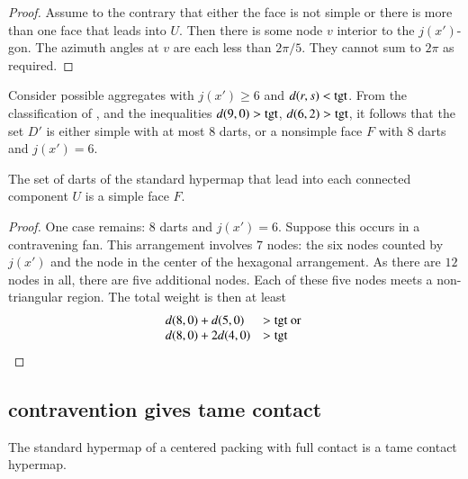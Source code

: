 \begin{proof} Assume to the contrary that either the face is not simple or there is more than one face that leads into $U$.  Then there is some node $v$ interior to the $j(x')$-gon.  The azimuth angles at $v$ are each less than $2\pi/5$. They cannot sum to $2\pi$ as required.
\end{proof}

Consider possible aggregates with $j(x')\ge 6$ and $d(r,s)<{\operatorname{tgt}}$.
From the classification of \cite[p.~126,~Fig.~12.1]{Hales:2006:DCG}, and the inequalities $d(9,0) > {\operatorname{tgt}}$, $d(6,2) > {\operatorname{tgt}}$, it follows that the set $D'$
is either simple with at most $8$ darts, or a nonsimple face $F$ with $8$ darts and $j(x')=6$.

\begin{lemma}\label{lemma:simple} The set of darts of the standard hypermap that lead into each connected component $U$ is a simple face $F$.
\end{lemma}
%
%

\begin{proof} One  case remains: $8$ darts and $j(x')=6$.  Suppose this occurs in a contravening fan.  This arrangement involves $7$ nodes: the six nodes counted by $j(x')$ and the node in the center of the hexagonal arrangement.  As there are $12$ nodes in all, there are five additional nodes.  Each of these five nodes meets a non-triangular region.  The total weight is then at least
$$
\begin{array}{lll}
d(8,0) + d(5,0) &> {\operatorname{tgt}}\hbox{ or }\\
d(8,0) + 2 d(4,0) &> {\operatorname{tgt}}\\
\end{array}
$$
\end{proof}
%
%








\subsection{contravention gives tame contact}

\begin{theorem} The standard hypermap of a centered packing with full contact is a tame contact hypermap.
\end{theorem}
%
%
%
%

